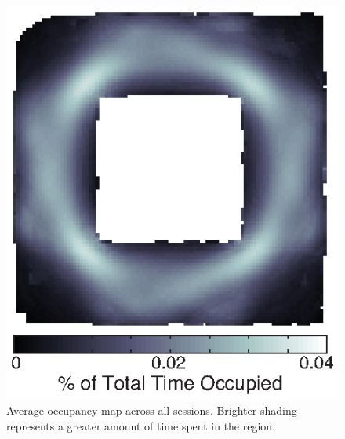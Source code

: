 \begin{figure}[bh]
\begin{center}
\includegraphics[width=.6\textwidth]{./tex/linearGrids/figs/supp_occupancy}
\caption[Average occupancy map]{Average occupancy map across all sessions. Brighter shading represents a greater amount of time spent in the region.}
\end{center}
\end{figure}

